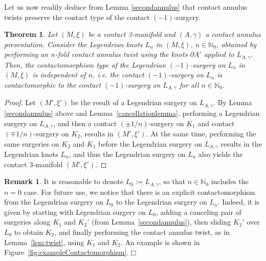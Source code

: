 \documentclass[11pt]{amsart} %
\newcommand{\N}{\mathbb{N}}
\theoremstyle{plain}
\newtheorem{thm}[Theorem]{Theorem}
\theoremstyle{definition}
\newtheorem{rem}[Theorem]{Remark}
\begin{document}
Let us now readily deduce from Lemma \ref{secondannulus} that contact annulus twists preserve the contact type of the contact $(-1)$-surgery.

\begin{thm}\label{mainannulustwist}
Let $(M,\xi)$ be a contact 3-manifold and $(A,\gamma)$ a contact annulus presentation. Consider the Legendrian knots $L_n$ in $(M,\xi)$, $n\in\N_0$, obtained by performing an $n$-fold contact annulus twist using the knots $\partial A'$ applied to $L_{A,\gamma}$. Then, the contactomorphism type of the Legendrian $(-1)$-surgery on $L_n$ in $(M,\xi)$ is independent of $n$, i.e. the contact $(-1)$-surgery on $L_n$ is contactomorphic to the contact $(-1)$-surgery on $L_{A,\gamma}$ for all $n\in\N_0$.
\end{thm}

\begin{proof} Let $(M',\xi')$ be the result of a Legendrian surgery on $L_{A,\gamma}$. By Lemma \ref{secondannulus} above and Lemma~\ref{cancellationlemma}, performing a Legendrian surgery on $L_{A,\gamma}$, and then a contact $(\pm 1/n)$-surgery on $K_1$ and contact $(\mp 1/n)$-surgery on $K_2$, results in $(M',\xi')$. At the same time, performing the same surgeries on $K_2$ and $K_1$ before the Legendrian surgery on $L_{A,\gamma}$ results in the Legendrian knots $L_n$, and thus the Legendrian surgery on $L_n$ also yields the contact 3-manifold $(M',\xi')$. 
\end{proof}



\begin{rem}\label{explicitdiffeom}
It is reasonable to denote $L_0:=L_{A,\gamma}$, so that $n\in\N_0$ includes the $n=0$ case. For future use, we notice that there is an explicit contactomorphism from the Legendrian surgery on $L_0$ to the Legendrian surgery on $L_n$. Indeed, it is given by starting with Legendrian surgery on $L_0$, adding a canceling pair of surgeries along $K_1$ and $K_2'$ (from Lemma~\ref{secondannulus}), then sliding $K_2'$ over $L_0$ to obtain $K_2$, and finally performing the contact annulus twist, as in Lemma~\ref{lem:twist}, using $K_1$ and $K_2$. An example is shown in Figure~\ref{fig:exampleContactomorphism}.\hfill$\Box$
\end{rem}
\end{document}
